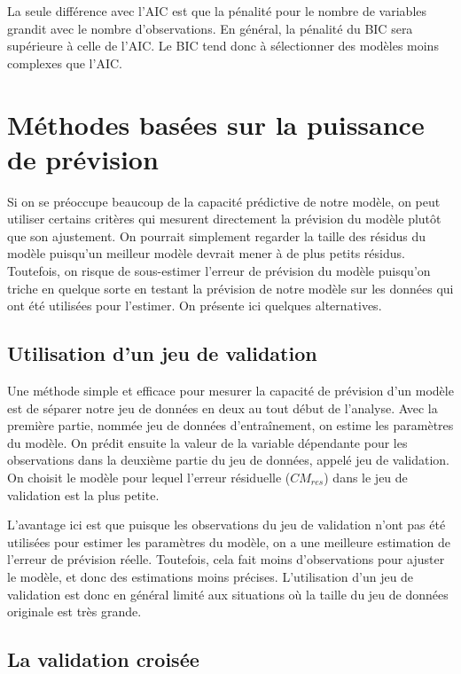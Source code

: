 La seule différence avec l'AIC est que la pénalité pour le nombre de variables grandit avec le nombre d'observations. En général, la pénalité du BIC sera supérieure à celle de l'AIC. Le BIC tend donc à sélectionner des modèles moins complexes que l'AIC.

\section{Méthodes basées sur la puissance de prévision}

Si on se préoccupe beaucoup de la capacité prédictive de notre modèle, on peut utiliser certains critères qui mesurent directement la prévision du modèle plutôt que son ajustement. On pourrait simplement regarder la taille des résidus du modèle puisqu'un meilleur modèle devrait mener à de plus petits résidus. Toutefois, on risque de sous-estimer l'erreur de prévision du modèle puisqu'on triche en quelque sorte en testant la prévision de notre modèle sur les données qui ont été utilisées pour l'estimer. On présente ici quelques alternatives.

\subsection{Utilisation d'un jeu de validation}

Une méthode simple et efficace pour mesurer la capacité de prévision d'un modèle est de séparer notre jeu de données en deux au tout début de l'analyse. Avec la première partie, nommée jeu de données d'entraînement, on estime les paramètres du modèle. On prédit ensuite la valeur de la variable dépendante pour les observations dans la deuxième partie du jeu de données, appelé jeu de validation. On choisit le modèle pour lequel l'erreur résiduelle ($CM_{res}$) dans le jeu de validation est la plus petite.

L'avantage ici est que puisque les observations du jeu de validation n'ont pas été utilisées pour estimer les paramètres du modèle, on a une meilleure estimation de l'erreur de prévision réelle. Toutefois, cela fait moins d'observations pour ajuster le modèle, et donc des estimations moins précises. L'utilisation d'un jeu de validation est donc en général limité aux situations où la taille du jeu de données originale est très grande.

\subsection{La validation croisée}

